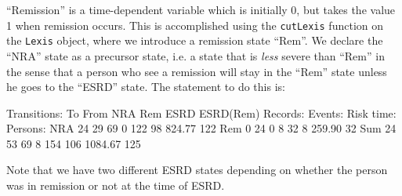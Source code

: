 \begin{enumerate}
  ``Remission'' is a time-dependent variable which is initially 0, but
  takes the value 1 when remission occurs. This is accomplished using
  the \texttt{cutLexis} function on the \texttt{Lexis} object, where
  we introduce a remission state ``Rem''. We declare the ``NRA'' state
  as a precursor state, i.e. a state that is \emph{less} severe than
  ``Rem'' in the sense that a person who see a remission will stay in
  the ``Rem'' state unless he goes to the ``ESRD'' state. The
  statement to do this is:
\begin{Schunk}
\begin{Soutput}
Transitions:
     To
From  NRA Rem ESRD ESRD(Rem)  Records:  Events: Risk time:  Persons:
  NRA  24  29   69         0       122       98     824.77       122
  Rem   0  24    0         8        32        8     259.90        32
  Sum  24  53   69         8       154      106    1084.67       125
\end{Soutput}
\end{Schunk}
Note that we have two different ESRD states depending on whether the
person was in remission or not at the time of ESRD.


\end{enumerate}
